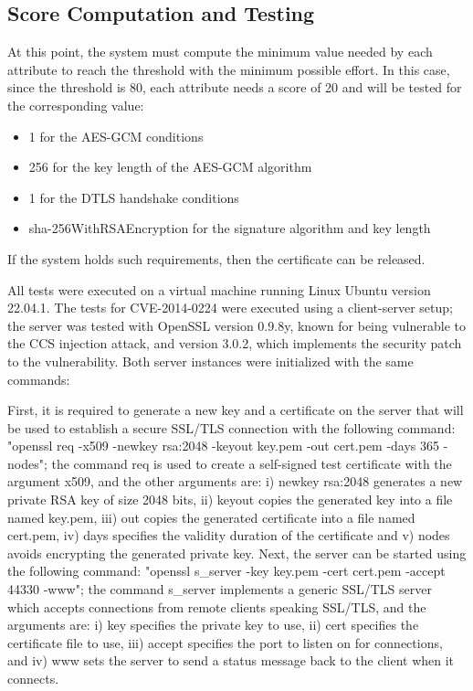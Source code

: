 \subsection{Score Computation and Testing}
At this point, the system must compute the minimum value needed by each attribute to reach the threshold with the minimum possible effort. In this case, since the threshold is 80, each attribute needs a score of 20 and will be tested for the corresponding value:
\begin{itemize}
    \item 1 for the AES-GCM conditions
    \item 256 for the key length of the AES-GCM algorithm
    \item 1 for the DTLS handshake conditions
    \item sha-256WithRSAEncryption for the signature algorithm and key length
\end{itemize}

If the system holds such requirements, then the certificate can be released.

All tests were executed on a virtual machine running Linux Ubuntu version 22.04.1.
The tests for CVE-2014-0224 were executed using a client-server setup; the server was tested with OpenSSL version 0.9.8y, known for being vulnerable to the CCS injection attack, and version 3.0.2, which implements the security patch to the vulnerability. Both server instances were initialized with the same commands:

First, it is required to generate a new key and a certificate on the server that will be used to establish a secure SSL/TLS connection with the following command:
"openssl req -x509 -newkey rsa:2048 -keyout key.pem -out cert.pem -days 365 -nodes"; the command req is used to create a self-signed test certificate with the argument x509, and the other arguments are: i) newkey rsa:2048 generates a new private RSA key of size 2048 bits, ii) keyout copies the generated key into a file named key.pem, iii) out copies the generated certificate into a file named cert.pem, iv) days specifies the validity duration of the certificate and v) nodes avoids encrypting the generated private key.
Next, the server can be started using the following command:
"openssl s\_server -key key.pem -cert cert.pem -accept 44330 -www"; the command s\_server implements a generic SSL/TLS server which accepts connections from remote clients speaking SSL/TLS, and the arguments are: i) key specifies the private key to use, ii) cert specifies the certificate file to use, iii) accept specifies the port to listen on for connections, and iv) www sets the server to send a status message back to the client when it connects.

